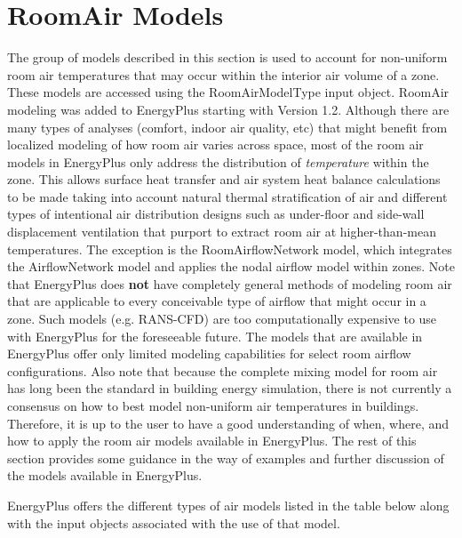 \section{RoomAir Models}\label{roomair-models}

The group of models described in this section is used to account for non-uniform room air temperatures that may occur within the interior air volume of a zone. These models are accessed using the RoomAirModelType input object. RoomAir modeling was added to EnergyPlus starting with Version 1.2. Although there are many types of analyses (comfort, indoor air quality, etc) that might benefit from localized modeling of how room air varies across space, most of the room air models in EnergyPlus only address the distribution of \emph{temperature} within the zone. This allows surface heat transfer and air system heat balance calculations to be made taking into account natural thermal stratification of air and different types of intentional air distribution designs such as under-floor and side-wall displacement ventilation that purport to extract room air at higher-than-mean temperatures. The exception is the RoomAirflowNetwork model, which integrates the AirflowNetwork model and applies the nodal airflow model within zones. Note that EnergyPlus does \textbf{not} have completely general methods of modeling room air that are applicable to every conceivable type of airflow that might occur in a zone. Such models (e.g. RANS-CFD) are too computationally expensive to use with EnergyPlus for the foreseeable future. The models that are available in EnergyPlus offer only limited modeling capabilities for select room airflow configurations. Also note that because the complete mixing model for room air has long been the standard in building energy simulation, there is not currently a consensus on how to best model non-uniform air temperatures in buildings. Therefore, it is up to the user to have a good understanding of when, where, and how to apply the room air models available in EnergyPlus. The rest of this section provides some guidance in the way of examples and further discussion of the models available in EnergyPlus.

EnergyPlus offers the different types of air models listed in the table below along with the input objects associated with the use of that model.

